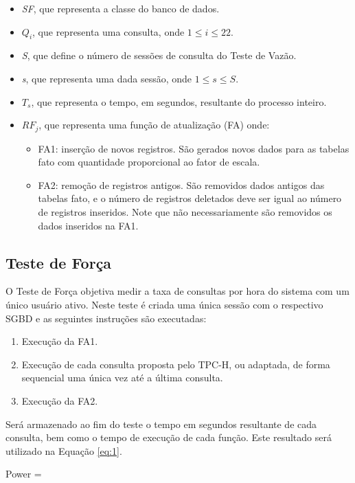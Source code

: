 \documentclass[conference]{IEEEtran}
\begin{document}
\begin{itemize}
	\item \textit{SF}, que representa a classe do banco de dados.
	\item \textit{$Q_{i}$}, que representa uma consulta, onde \mbox{$1 \le i \le 22$}.
	\item \textit{S}, que define o número de sessões de consulta do Teste de Vazão.
	\item \textit{s}, que representa uma dada sessão, onde \mbox{$1 \le s \le S$}.
	\item \textit{$T_{s}$}, que representa o tempo, em segundos, resultante do processo inteiro.
	\item \textit{$RF_{j}$}, que representa uma função de atualização (FA) onde:
		\begin{itemize}
		    \item FA1: inserção de novos registros. São gerados novos dados para as tabelas fato com quantidade proporcional ao fator de escala. 
		    \item FA2: remoção de registros antigos. São removidos dados antigos das tabelas fato, e o número de registros deletados deve ser igual ao número de registros inseridos. Note que não necessariamente são removidos os dados inseridos na FA1.
		\end{itemize}
\end{itemize}

\subsection{Teste de Força}
\label{power_test}
O Teste de Força objetiva medir a taxa de consultas por hora do sistema com um único usuário ativo. Neste teste é criada uma única sessão com o respectivo SGBD e as seguintes instruções são executadas:

\begin{enumerate}
	\item Execução da FA1.
	\item Execução de cada consulta proposta pelo TPC-H, ou adaptada, de forma sequencial uma única vez até a última consulta.
	\item Execução da FA2.
\end{enumerate}

Será armazenado ao fim do teste o tempo em segundos resultante de cada consulta, bem como o tempo de execução de cada função. Este resultado será utilizado na Equação \ref{eq:1}.

\begin{myequation}%
\label{eq:1}
{\scriptstyle Power = } {\scriptstyle {}} %
\end{myequation}
%
\end{document}
